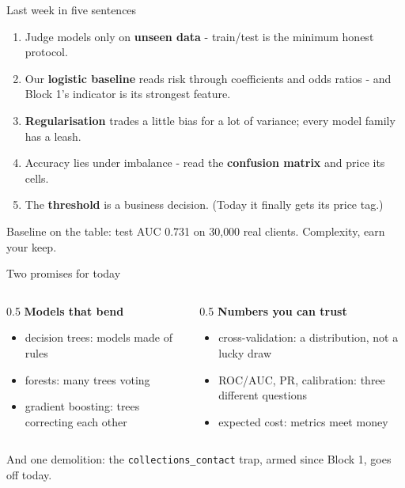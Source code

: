 \documentclass[10pt,aspectratio=169]{beamer}
\begin{document}
\begin{frame}{Last week in five sentences}
  \begin{enumerate}
    \item Judge models only on \textbf{unseen data} - train/test is the
          minimum honest protocol.
    \item Our \textbf{logistic baseline} reads risk through coefficients and
          odds ratios - and Block 1's indicator is its strongest feature.
    \item \textbf{Regularisation} trades a little bias for a lot of variance;
          every model family has a leash.
    \item Accuracy lies under imbalance - read the \textbf{confusion
          matrix} and price its cells.
    \item The \textbf{threshold} is a business decision. (Today it finally
          gets its price tag.)
  \end{enumerate}
  \vspace{0.5em}
  \begin{center}
    Baseline on the table: test AUC \alert{0.731} on 30{,}000 real clients.
    Complexity, earn your keep.
  \end{center}
\end{frame}

\begin{frame}{Two promises for today}
  \begin{columns}[T]
    \begin{column}{0.5\textwidth}
      \textbf{Models that bend}
      \begin{itemize}\small
        \item decision trees: models made of rules
        \item forests: many trees voting
        \item gradient boosting: trees correcting each other
      \end{itemize}
    \end{column}
    \begin{column}{0.5\textwidth}
      \textbf{Numbers you can trust}
      \begin{itemize}\small
        \item cross-validation: a distribution, not a lucky draw
        \item ROC/AUC, PR, calibration: three different questions
        \item expected cost: metrics meet money
      \end{itemize}
    \end{column}
  \end{columns}
  \vspace{0.8em}
  \begin{center}
    And one demolition: the \texttt{collections\_contact} trap, armed since
    Block 1, \alert{goes off today}.
  \end{center}
\end{frame}
\end{document}
